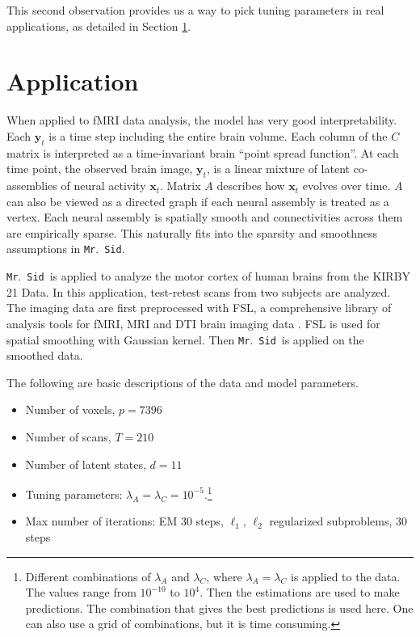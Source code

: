 \documentclass[fleqn]{article}
\let\oldref\ref
\renewcommand{\ref}[1]{(\oldref{#1})}
\newcommand{\mrsid}{{\sc \texttt{Mr}.~\texttt{Sid}}}
\providecommand{\mb}[1]{\boldsymbol{#1}}
\newcommand{\bx}{\mb{x}}
\newcommand{\by}{\mb{y}}
\begin{document}
This second observation provides us a way to pick tuning parameters in real applications, as detailed in Section \oldref{sec:application}.



\section{Application}
\label{sec:application}
When applied to fMRI data analysis, the model has very good interpretability. Each $\by_t$ is a time step including the entire brain volume. Each column of the $C$ matrix is interpreted as a time-invariant brain ``point spread function''. At each time point, the observed brain image, $\by_t$, is a linear mixture of latent co-assemblies of neural activity  $\bx_t$. Matrix $A$ describes how $\bx_t$ evolves over time. $A$ can also be viewed as a directed graph if each neural assembly is treated as a vertex. Each neural assembly is spatially smooth and connectivities across them are empirically sparse. This naturally fits into the sparsity and smoothness assumptions in \mrsid.

\mrsid~is applied to analyze the motor cortex of human brains from the KIRBY 21 Data. In this application, test-retest scans from two subjects are analyzed. The imaging data are first preprocessed with FSL, a comprehensive library of analysis tools for fMRI, MRI and DTI brain imaging data \cite{smith2004advances}. FSL is used for spatial smoothing with Gaussian kernel. Then \mrsid~is applied on the smoothed data.

The following are basic descriptions of the data and model parameters.
\begin{itemize}[noitemsep, topsep=0pt]
\item Number of voxels, $p = 7396$
\item Number of scans, $T = 210$
\item Number of latent states, $d = 11$
\item Tuning parameters: $\lambda_A = \lambda_C = 10^{-5}$.\footnote{Different combinations of $\lambda_A$ and $\lambda_C$, where $\lambda_A = \lambda_C$ is applied to the data. The values range from $10^{-10}$ to $10^{4}$. Then the estimations are used to make predictions. The combination that gives the best predictions is used here. One can also use a grid of combinations, but it is time consuming.}
\item Max number of iterations: EM 30 steps, $\ell_1$, $\ell_2$ regularized subproblems, 30 steps
\end{itemize}
\end{document}
